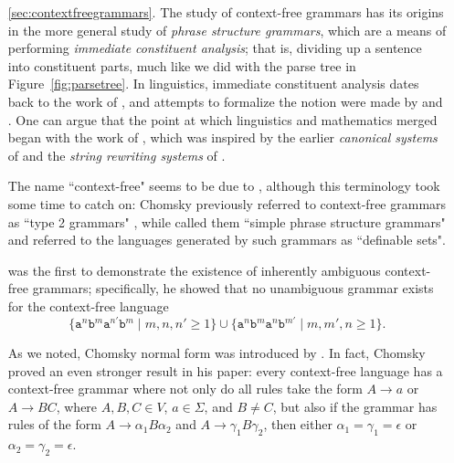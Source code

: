 \begin{enumerate}
\item[\ref{sec:contextfreegrammars}.] The study of context-free grammars has its origins in the more general study of \emph{phrase structure grammars}, which are a means of performing \emph{immediate constituent analysis}; that is, dividing up a sentence into constituent parts, much like we did with the parse tree in Figure~\ref{fig:parsetree}. In linguistics, immediate constituent analysis dates back to the work of \citet{Bloomfield1933Language}, and attempts to formalize the notion were made by \citet{Harris1946MorphemeUtterance} and \citet{Wells1947ImmediateConstituents}. One can argue that the point at which linguistics and mathematics merged began with the work of \citet{Chomsky1956ThreeModels}, which was inspired by the earlier \emph{canonical systems} of \citet{Post1943FormalReductionsCombinatorial} and the \emph{string rewriting systems} of \citet{Thue1914Veranderungen}.

The name ``context-free" seems to be due to \citet{Chomsky1959NotePhraseStructure}, although this terminology took some time to catch on: Chomsky previously referred to context-free grammars as ``type 2 grammars" \citeyearpar{Chomsky1959FormalPropertiesGrammars}, while \citet*{BarHillel1961FormalPropertiesPhraseStructureGrammars} called them ``simple phrase structure grammars" and \citet{GinsburgRice1962LanguagesRelatedALGOL} referred to the languages generated by such grammars as ``definable sets".

\citet{Parikh1961LanguageGeneratingDevices} was the first to demonstrate the existence of inherently ambiguous context-free grammars; specifically, he showed that no unambiguous grammar exists for the context-free language
\begin{equation*}
\{\texttt{a}^{n}\texttt{b}^{m}\texttt{a}^{n'}\texttt{b}^{m} \mid m, n, n' \geq 1\} \cup \{\texttt{a}^{n}\texttt{b}^{m}\texttt{a}^{n}\texttt{b}^{m'} \mid m, m', n \geq 1\}.
\end{equation*}

As we noted, Chomsky normal form was introduced by \citet{Chomsky1959FormalPropertiesGrammars}. In fact, Chomsky proved an even stronger result in his paper: every context-free language has a context-free grammar where not only do all rules take the form $A \rightarrow a$ or $A \rightarrow BC$, where $A, B, C \in V$, $a \in \Sigma$, and $B \neq C$, but also if the grammar has rules of the form $A \rightarrow \alpha_{1}B\alpha_{2}$ and $A \rightarrow \gamma_{1}B\gamma_{2}$, then either $\alpha_{1} = \gamma_{1} = \epsilon$ or $\alpha_{2} = \gamma_{2} = \epsilon$.


\end{enumerate}
